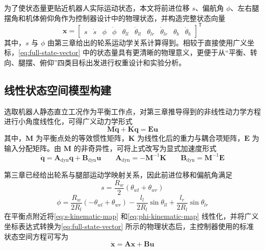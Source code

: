 为了使状态量更贴近机器人实际运动状态，本文将前进位移 $s$、偏航角 $\phi$、左右腿摆角和机体俯仰角作为控制器设计中的物理状态，并构造完整状态向量
\begin{equation}
  \boldsymbol{x}
  =
  \begin{bmatrix}
    s & \dot{s} & \phi & \dot{\phi} & \theta_{ll} & \dot{\theta}_{ll} &
    \theta_{lr} & \dot{\theta}_{lr} & \theta_b & \dot{\theta}_b
  \end{bmatrix}^{\mathsf{T}}
  \label{eq:full-state-vector}
\end{equation}
其中，$s$ 与 $\phi$ 由第三章给出的轮系运动学关系计算得到。相较于直接使用广义坐标，\eqref{eq:full-state-vector} 中的状态量具有更清晰的物理意义，更便于从“平衡、转向、腿摆、俯仰”四类目标出发进行权重设计和实验分析。

\subsection{线性状态空间模型构建}

选取机器人静态直立工况作为平衡工作点，对第三章推导得到的非线性动力学方程进行小角度线性化，可得广义动力学形式
\begin{equation}
  \boldsymbol{M}\ddot{\boldsymbol{q}} + \boldsymbol{K}\boldsymbol{q} = \boldsymbol{E}\boldsymbol{u}
  \label{eq:linearized-generalized-dynamics}
\end{equation}
其中，$\boldsymbol{M}$ 为平衡点处的等效惯性矩阵，$\boldsymbol{K}$ 为线性化后的重力与耦合项矩阵，$\boldsymbol{E}$ 为输入分配矩阵。由 $\boldsymbol{M}$ 的非奇异性，可将上式改写为显式加速度形式
\begin{equation}
  \ddot{\boldsymbol{q}}
  =
  \boldsymbol{A}_{\mathrm{dyn}} \boldsymbol{q}
  +
  \boldsymbol{B}_{\mathrm{dyn}} \boldsymbol{u}
  \qquad
  \boldsymbol{A}_{\mathrm{dyn}} = -\boldsymbol{M}^{-1}\boldsymbol{K}
  \qquad
  \boldsymbol{B}_{\mathrm{dyn}} = \boldsymbol{M}^{-1}\boldsymbol{E}
  \label{eq:qdd-dyn}
\end{equation}

第三章已经给出轮系与腿部运动学映射关系，因此前进位移和偏航角满足
\begin{equation}
  s = \frac{R_w}{2}\left(\theta_{wl} + \theta_{wr}\right)
  \label{eq:s-kinematic-map}
\end{equation}
\begin{equation}
  \phi
  =
  \frac{R_w}{2R_l}\left(-\theta_{wl} + \theta_{wr}\right)
  -
  \frac{l_l}{2R_l}\sin \theta_{ll}
  +
  \frac{l_r}{2R_l}\sin \theta_{lr}
  \label{eq:phi-kinematic-map}
\end{equation}
在平衡点附近将\eqref{eq:s-kinematic-map} 和\eqref{eq:phi-kinematic-map} 线性化，并将广义坐标表达式转换为\eqref{eq:full-state-vector} 所示的物理状态后，主控制器使用的标准状态空间方程可写为
\begin{equation}
  \dot{\boldsymbol{x}} = \boldsymbol{A}\boldsymbol{x} + \boldsymbol{B}\boldsymbol{u}
  \label{eq:linear-state-space}
\end{equation}

